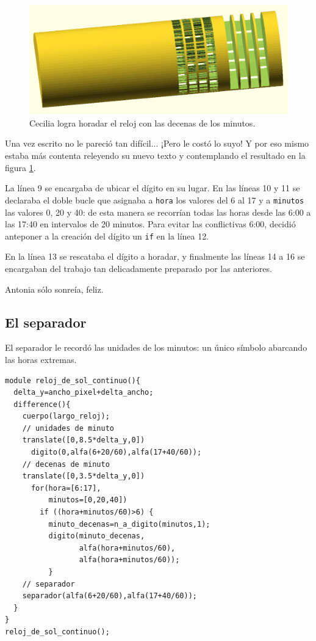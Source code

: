 \begin{figure}[ht]
  \centering
  \includegraphics[width=.85\textwidth]{imagenes/decenas-minutos-1}  
  \caption{Cecilia logra horadar el reloj con las decenas de los
    minutos.}
  \label{fig:decenas-minutos-1}
\end{figure}


Una vez escrito no le pareció tan difícil... ¡Pero le costó lo suyo!
Y por eso mismo estaba más contenta releyendo su nuevo texto y
contemplando el resultado en la figura \ref{fig:decenas-minutos-1}.

La línea 9 se encargaba de ubicar el dígito en su lugar. En las líneas
10 y 11 se declaraba el doble bucle que asignaba a \lstinline!hora!
los valores del 6 al 17 y a \lstinline!minutos! las valores 0, 20 y
40: de esta manera se recorrían todas las horas desde las 6:00 a las
17:40 en intervalos de 20 minutos. Para evitar las conflictivas 6:00,
decidió anteponer a la creación del dígito un \lstinline!if! en la
línea 12.

En la línea 13 se rescataba el dígito a horadar, y finalmente las
líneas 14 a 16 se encargaban del trabajo tan delicadamente preparado
por las anteriores.

Antonia sólo sonreía, feliz.

\subsection{El separador}

El separador le recordó las unidades de los minutos: un único símbolo
abarcando las horas extremas.

\begin{lstlisting}
module reloj_de_sol_continuo(){
  delta_y=ancho_pixel+delta_ancho;
  difference(){
    cuerpo(largo_reloj);    
    // unidades de minuto
    translate([0,8.5*delta_y,0])
      digito(0,alfa(6+20/60),alfa(17+40/60));  
    // decenas de minuto
    translate([0,3.5*delta_y,0])
      for(hora=[6:17],
          minutos=[0,20,40])
        if ((hora+minutos/60)>6) {
          minuto_decenas=n_a_digito(minutos,1);
          digito(minuto_decenas,
                 alfa(hora+minutos/60),
                 alfa(hora+minutos/60));
          }
    // separador
    separador(alfa(6+20/60),alfa(17+40/60));  
  }  
}
reloj_de_sol_continuo();
\end{lstlisting}%



